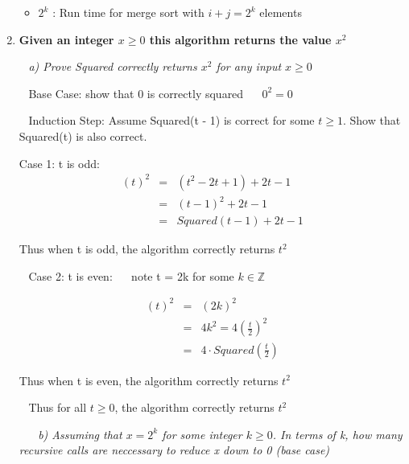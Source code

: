 \documentclass[12pt, letterpaper]{article}
\begin{document}
\begin{enumerate}
\begin{itemize}
        \item \textnormal{\( 2^k\) : Run time for merge sort with \(i + j = 2^k\) elements}
    \end{itemize} 


    \newpage
    \item 
    \bf{ Given an integer \(x \ge 0\) this algorithm returns the value \(x^2\) }

    \-\ \newline
    \it{ a) Prove Squared correctly returns \(x^2\) for any input \(x \ge 0\) }

    \-\ \newline
    Base Case: \textnormal{show that 0 is correctly squared}
    \-\ \newline
    \-\ \(0^2 = 0\)

    \-\ \newline
    Induction Step: \textnormal{ Assume Squared(t - 1) is correct for some \(t \ge 1\). Show that Squared(t) is also correct. }

    Case 1: t is odd:
    \begin{eqnarray}
        (t)^2 &=& (t^2 -2t + 1) + 2t - 1 \\
        &=& (t - 1)^2 + 2t - 1 \\
        &=& Squared(t - 1) + 2t - 1
    \end{eqnarray}

    Thus when t is odd, the algorithm correctly returns \(t^2\)

    \-\ \newline
    Case 2: t is even:
    \-\ \newline
    \-\ note t = 2k for some \(k \in \mathbb{Z}\)

    \begin{eqnarray}
        (t)^2 &=& (2k)^2 \\
        &=& 4k^2 = 4\left(\frac{t}{2}\right)^2 \\
        &=& 4 \cdot Squared\left(\frac{t}{2}\right)
    \end{eqnarray}

    Thus when t is even, the algorithm correctly returns \(t^2\)

    \-\ \newline
    Thus for all \(t \ge 0\), the algorithm correctly returns \(t^2\)

    \-\ \newline
    \-\ \newline
    \it{ b) Assuming that \(x = 2^k\) for some integer \(k \ge 0\). In terms of k, how many recursive calls are neccessary to reduce x down to 0 (base case) }


\end{enumerate}
\end{document}
